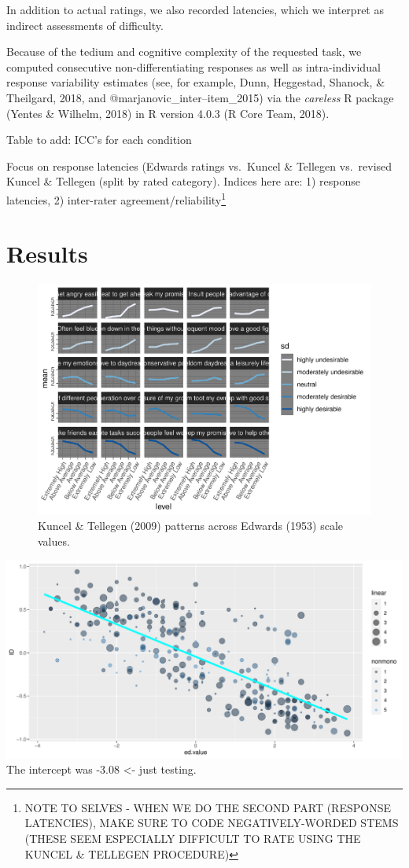 \documentclass[
  english,
  ,jou]{apa6}
\begin{document}
In addition to actual ratings, we also recorded latencies, which we interpret as indirect assessments of difficulty.

Because of the tedium and cognitive complexity of the requested task, we computed consecutive non-differentiating responses as well as intra-individual response variability estimates (see, for example, Dunn, Heggestad, Shanock, \& Theilgard, 2018, and @marjanovic\_inter--item\_2015) via the \emph{careless} R package (Yentes \& Wilhelm, 2018) in R version 4.0.3 (R Core Team, 2018).

Table to add: ICC's for each condition

Focus on response latencies (Edwards ratings vs.~Kuncel \& Tellegen vs.~revised Kuncel \& Tellegen (split by rated category). Indices here are: 1) response latencies, 2) inter-rater agreement/reliability\footnote{NOTE TO SELVES - WHEN WE DO THE SECOND PART (RESPONSE LATENCIES), MAKE SURE TO CODE NEGATIVELY-WORDED STEMS (THESE SEEM ESPECIALLY DIFFICULT TO RATE USING THE KUNCEL \& TELLEGEN PROCEDURE)}

\hypertarget{results}{%
\section{Results}\label{results}}

\begin{figure}
\centering
\includegraphics{KuncelTellegen_files/figure-latex/Figure2-1.pdf}
\caption{\label{fig:Figure2}Kuncel \& Tellegen (2009) patterns across Edwards (1953) scale values.}
\end{figure}

\includegraphics{KuncelTellegen_files/figure-latex/Figure3-1.pdf}
The intercept was -3.08 \textless- just testing.
\end{document}
